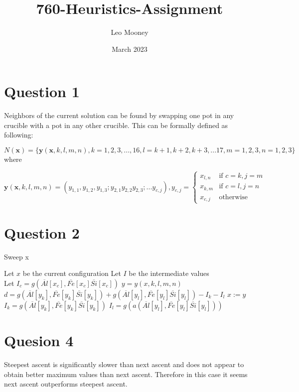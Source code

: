 \documentclass{article}
\title{760-Heuristics-Assignment}
\author{Leo Mooney}
\date{March 2023}
\begin{document}
\maketitle

\section{Question 1}
Neighbors of the current solution can be found by swapping one pot in
any crucible with a pot in any other crucible.
This can be formally defined as following:

$N(\mathbf{x}) = \{\mathbf{y}(\mathbf{x}, k, l, m, n), k=1,2,3,...,16, 
l=k+1,k+2,k+3,...17, m=1,2,3, n=1,2,3\}$ where

$$\mathbf{y}(\mathbf{x},k,l,m,n)=(y_{1, 1},y_{1, 2},y_{1, 3};
y_{2, 1}y_{2, 2}y_{2, 3};...y_{c, j}),y_{c,j}=
\begin{cases}
    x_{l, n} & \text{if } c=k,j=m \\
    x_{k, m} & \text{if } c=l,j=n \\
    x_{c,j} & \text{otherwise}
\end{cases}$$

\section{Question 2}
\begin{algorithm}
\caption{Sweep x}
\begin{algorithmic}
\STATE Let $x$ be the current configuration
\STATE Let $I$ be the intermediate values\\
\STATE Let $I_c = g(\overline{Al}[x_c], \overline{Fe}[x_c] \overline{Si}[x_c])$
\STATE $y = y(x, k, l, m, n)$ 
\STATE $d = g(\overline{Al}[y_k], \overline{Fe}[y_k] \overline{Si}[y_k]) + g(\overline{Al}[y_l], \overline{Fe}[y_l] \overline{Si}[y_l]) - I_k - I_l$
\STATE $x := y$ 
\STATE $I_k = g(\overline{Al}[y_k], \overline{Fe}[y_k] \overline{Si}[y_k])$ 
\STATE $I_l = g(a(\overline{Al}[y_l], \overline{Fe}[y_l] \overline{Si}[y_l]))$ 
\ENDIF
\ENDFOR
\end{algorithmic}
\end{algorithm}

\section{Quesion 4}
Steepest ascent is significantly slower than next ascent and does not 
appear to obtain better maximum values than next ascent. Therefore in
this case it seems next ascent outperforms steepest ascent.
\end{document}
